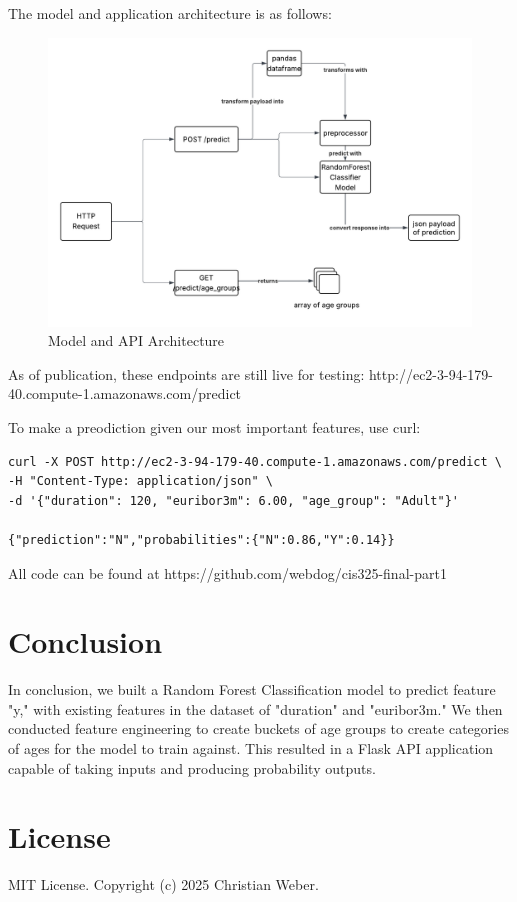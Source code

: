 \documentclass{article}
\begin{document}
The model and application architecture is as follows:

\begin{figure}[H]
    \centering
    \includegraphics[width=0.75\linewidth]{paper/Code Layout-Final.png}
    \caption{Model and API Architecture}
    \label{fig:enter-label}
\end{figure}

As of publication, these endpoints are still live for testing:
\newline
\newline
http://ec2-3-94-179-40.compute-1.amazonaws.com/predict
\newline

To make a preodiction given our most important features, use curl:

\noindent\begin{minipage}{\linewidth}
\begin{verbatim}
curl -X POST http://ec2-3-94-179-40.compute-1.amazonaws.com/predict \
-H "Content-Type: application/json" \
-d '{"duration": 120, "euribor3m": 6.00, "age_group": "Adult"}'

{"prediction":"N","probabilities":{"N":0.86,"Y":0.14}}
\end{verbatim}
\end{minipage}

All code can be found at https://github.com/webdog/cis325-final-part1

\section{Conclusion}

In conclusion, we built a Random Forest Classification model to predict feature "y," with existing features in the dataset of "duration" and "euribor3m." We then conducted feature engineering to create buckets of age groups to create categories of ages for the model to train against. This resulted in a Flask API application capable of taking inputs and producing probability outputs.

\section{License}
MIT License. Copyright (c) 2025 Christian Weber.
\end{document}
